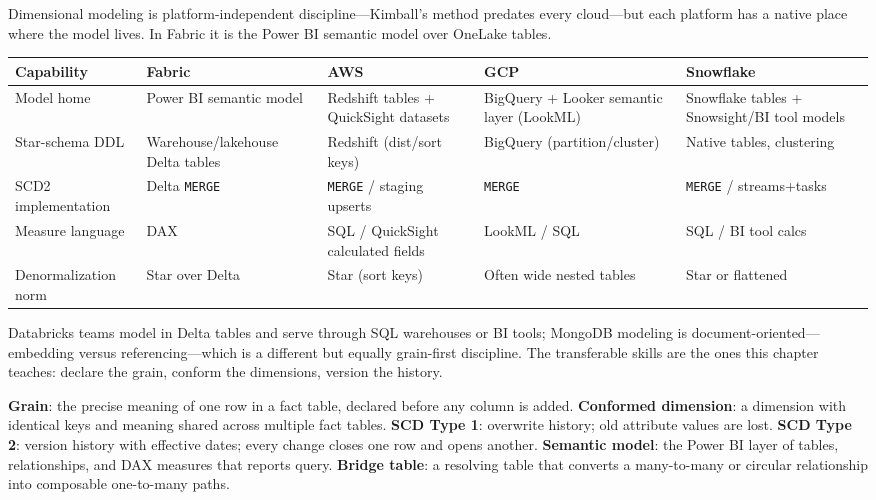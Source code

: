 \begin{crosscloud}
Dimensional modeling is platform-independent discipline---Kimball's method predates every cloud---but each platform has a native place where the model lives. In Fabric it is the Power BI semantic model over OneLake tables.

\vspace{2mm}
{\footnotesize
\begin{tabular}{@{}p{2.8cm}p{3.2cm}p{3.2cm}p{3.2cm}p{3.2cm}@{}}
\toprule
\textbf{Capability} & \textbf{Fabric} & \textbf{AWS} & \textbf{GCP} & \textbf{Snowflake} \\
\midrule
Model home & Power BI semantic model & Redshift tables + QuickSight datasets & BigQuery + Looker semantic layer (LookML) & Snowflake tables + Snowsight/BI tool models \\
Star-schema DDL & Warehouse/lakehouse Delta tables & Redshift (dist/sort keys) & BigQuery (partition/cluster) & Native tables, clustering \\
SCD2 implementation & Delta \texttt{MERGE} & \texttt{MERGE} / staging upserts & \texttt{MERGE} & \texttt{MERGE} / streams+tasks \\
Measure language & DAX & SQL / QuickSight calculated fields & LookML / SQL & SQL / BI tool calcs \\
Denormalization norm & Star over Delta & Star (sort keys) & Often wide nested tables & Star or flattened \\
\bottomrule
\end{tabular}}

\vspace{1mm}
Databricks teams model in Delta tables and serve through SQL warehouses or BI tools; MongoDB modeling is document-oriented---embedding versus referencing---which is a different but equally grain-first discipline. The transferable skills are the ones this chapter teaches: declare the grain, conform the dimensions, version the history.
\end{crosscloud}

\begin{keyterms}
\textbf{Grain}: the precise meaning of one row in a fact table, declared before any column is added. \quad
\textbf{Conformed dimension}: a dimension with identical keys and meaning shared across multiple fact tables. \quad
\textbf{SCD Type 1}: overwrite history; old attribute values are lost. \quad
\textbf{SCD Type 2}: version history with effective dates; every change closes one row and opens another. \quad
\textbf{Semantic model}: the Power BI layer of tables, relationships, and DAX measures that reports query. \quad
\textbf{Bridge table}: a resolving table that converts a many-to-many or circular relationship into composable one-to-many paths.
\end{keyterms}

